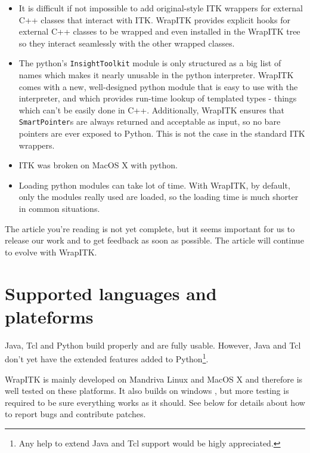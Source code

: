 \documentclass{InsightArticle}
\begin{document}
\begin{itemize}
  \item  It is difficult if not impossible to add original-style ITK wrappers for
external C++ classes that interact with ITK. WrapITK provides explicit hooks for
external C++ classes to be wrapped and even installed in the WrapITK tree so
they interact seamlessly with the other wrapped classes.

  \item  The python's \verb$InsightToolkit$ module is only structured as a big
list of names which makes it nearly unusable in the python interpreter. WrapITK
comes with a new, well-designed python module that is easy to use with the interpreter, and
which provides run-time lookup of templated types - things which can't be easily done
in C++. Additionally, WrapITK ensures that \verb$SmartPointer$s are always
returned and acceptable as input, so no bare pointers are ever exposed to
Python. This is not the case in the standard ITK wrappers.

  \item ITK was broken on MacOS X \cite{MacOsXWebSite} with python.

  \item  Loading python modules can take lot of time. With WrapITK, by default,
only the modules really used are loaded, so the loading time is much shorter
in common situations.

\end{itemize}

The article you're reading is not yet complete,
but it seems important for us to release our work and to get feedback
as soon as possible. The article will continue to evolve with WrapITK.

\newpage
\part{Supported languages and plateforms}

Java, Tcl and Python build properly and are fully usable. However, Java and
Tcl don't yet have the extended features added to Python\footnote{Any help
to extend Java and Tcl support would be higly appreciated.}.

WrapITK is mainly developed on Mandriva Linux \cite{MandrivaWebSite} and 
MacOS X \cite{MacOsXWebSite} and therefore is well tested on these platforms.
It also builds on windows \cite{WindowsWebSite}, but more testing is required
to be sure everything works as it should. See below for details about how
to report bugs and contribute patches.
\end{document}
